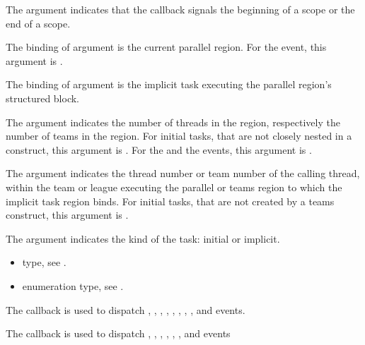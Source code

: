 \argdesc

The  argument indicates that the callback signals
the beginning of a scope or the end of a scope.

The binding of argument  is the current
parallel region.
For the  event, this argument is .

The binding of argument  is the implicit task
executing the parallel region's structured block.

The argument  indicates the number of
threads in the  region, respectively the number of 
teams in the  region.
For initial tasks, that are not closely nested in a  
construct, this argument is .
For the  and the  events, 
this argument is .

The argument  indicates the thread number or team number 
of the calling thread, within the team or league executing the 
parallel or teams region to which the implicit task region binds.
For initial tasks, that are not created by a teams construct, this 
argument is .

The argument  indicates the kind of the task: initial or
implicit.

\crossreferences
\begin{itemize}
\item {} type, see
.
\item {} enumeration type, see
.
\end{itemize}



\label{sec:ompt_callback_sync_region_t}
\summary
The  callback is used to dispatch
, ,
, ,
, ,
, ,
 and  events.

The  callback is used to dispatch
, ,
, ,
, ,
 and  events

